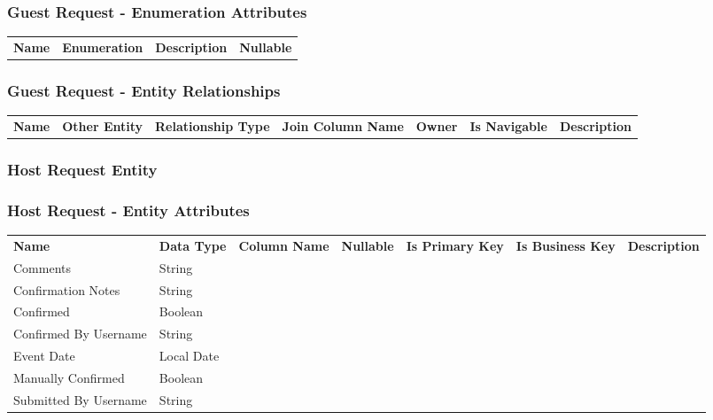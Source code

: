 \subsubsection*{ Guest Request - Enumeration Attributes}

\begin{tabular}{lcp{6.0cm}c}
\bfseries Name & \bfseries Enumeration & \bfseries Description & \bfseries Nullable \\
\end{tabular}

\subsubsection*{ Guest Request - Entity Relationships}

\begin{tabular}{llllllp{2.0cm}}
\bfseries Name & \bfseries Other Entity & \bfseries Relationship Type & \bfseries Join Column Name & \bfseries Owner & \bfseries Is Navigable & \bfseries Description\\
\end{tabular}


\subsubsection{ Host Request Entity }

\subsubsection*{ Host Request - Entity Attributes }

\begin{tabular}{lllcccl}
\bfseries Name & \bfseries Data Type & \bfseries Column Name & \bfseries Nullable & \bfseries Is Primary Key & \bfseries Is Business Key & \bfseries Description\\
Comments & String &  &  &  &  &  \\
Confirmation Notes & String &  &  &  &  &  \\
Confirmed & Boolean &  &  &  &  &  \\
Confirmed By Username & String &  &  &  &  &  \\
Event Date & Local Date &  &  &  &  &  \\
Manually Confirmed & Boolean &  &  &  &  &  \\
Submitted By Username & String &  &  &  &  &  \\
\end{tabular}

